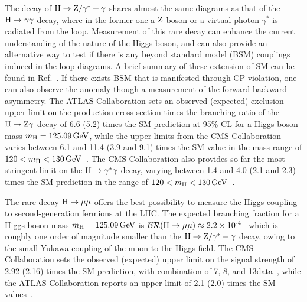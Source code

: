 The decay of $\mathrm{H}\to\mathrm{Z}/\gamma^{*}+\gamma$ shares almost the same diagrams as that of the $\mathrm{H}\to\gamma\gamma$ decay, where in the former one a $\mathrm{Z}$ boson or a virtual photon $\gamma^{*}$ is radiated from the loop. Measurement of this rare decay can enhance the current understanding of the nature of the Higgs boson, and can also provide an alternative way to test if there is any beyond standard model (BSM) couplings induced in the loop diagrams. A brief summary of these extension of SM can be found in Ref.~\cite{Sirunyan:2018tbk,Aaboud:2017uhw}. If there exists BSM that is manifested through CP violation, one can also observe the anomaly though a measurement of the forward-backward asymmetry. The ATLAS Collaboration sets an observed (expected) exclusion upper limit on the production cross section times the branching ratio of the $\mathrm{H}\to\mathrm{Z}\gamma$ decay of 6.6 (5.2) times the SM prediction at 95\% CL for a Higgs boson mass $m_{\mathrm{H}}=125.09\,\text{Ge\hspace{-.08em}V}$, while the upper limits from the CMS Collaboration varies between 6.1 and 11.4 (3.9 and 9.1) times the SM value in the mass range of $120<m_{\mathrm{H}}<130\,\text{Ge\hspace{-.08em}V}$~\cite{Sirunyan:2018tbk,Aaboud:2017uhw}. The CMS Collaboration also provides so far the most stringent limit on the $\mathrm{H}\to\gamma^{*}\gamma$ decay, varying between 1.4 and 4.0 (2.1 and 2.3) times the SM prediction in the range of $120<m_{\mathrm{H}}<130\,\text{Ge\hspace{-.08em}V}$~\cite{Sirunyan:2018tbk}.

The rare decay $\mathrm{H}\to\mu\mu$ offers the best possibility to measure the Higgs coupling to second-generation fermions at the LHC. The expected branching fraction for a Higgs boson mass $m_{\mathrm{H}}=125.09\,\text{Ge\hspace{-.08em}V}$ is $\mathcal{BR}(\mathrm{H}\to\mu\mu)\approx 2.2\times \text{10}^\text{-4}$~\cite{deFlorian:2016spz} which is roughly one order of magnitude smaller than the $\mathrm{H}\to\mathrm{Z}/\gamma^{*}+\gamma$ decay, owing to the small Yukawa coupling of the muon to the Higgs field. The CMS Collaboration sets the observed (expected) upper limit on the signal strength of 2.92 (2.16) times the SM prediction, with combination of 7, 8, and 13\TeV data~\cite{Sirunyan:2018hbu}, while the ATLAS Collaboration reports an upper limit of 2.1 (2.0) times the SM values~\cite{ATLAS-CONF-2018-026}.

